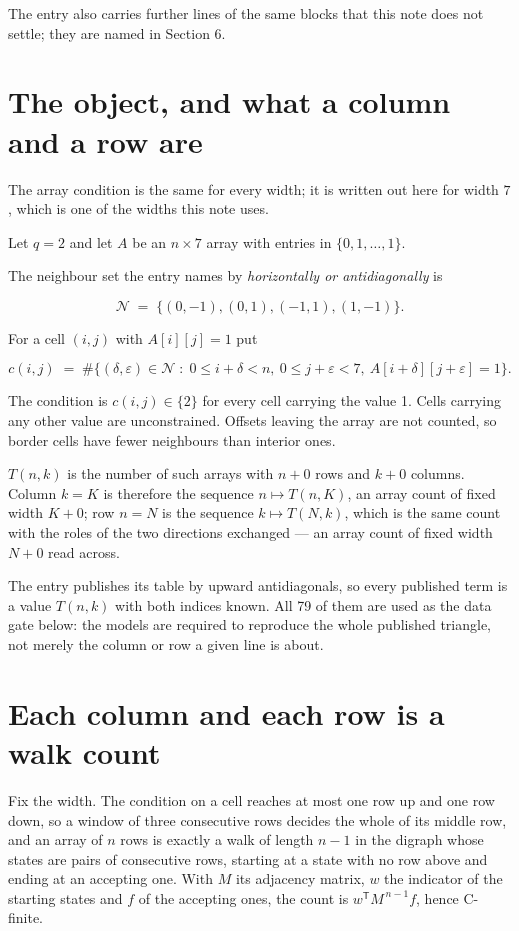 \documentclass[11pt]{article}
\theoremstyle{definition}
\begin{document}
The entry also carries further lines of the same blocks that this note does not settle; they are named in Section 6.

\section{The object, and what a column and a row are}

The array condition is the same for every width; it is written out here for width $7$, which is one of the widths this note uses.

Let $q = 2$ and let $A$ be an $n \times 7$ array with entries in $\{0,1,\dots,1\}$.

The neighbour set the entry names by {\itshape horizontally or antidiagonally} is

\[\mathcal{N} \;=\; \{(0,-1), (0,1), (-1,1), (1,-1)\}.\]

For a cell $(i,j)$ with $A[i][j] = 1$ put

\[c(i,j) \;=\; \#\bigl\{(\delta,\varepsilon)\in\mathcal{N} \;:\; 0\le i+\delta<n,\ 0\le j+\varepsilon<7,\ A[i+\delta][j+\varepsilon] = 1\bigr\}.\]

The condition is $c(i,j) \in \{2\}$ for every cell carrying the value 1. Cells carrying any other value are unconstrained. Offsets leaving the array are not counted, so border cells have fewer neighbours than interior ones.

$T(n,k)$ is the number of such arrays with $n + 0$ rows and $k + 0$ columns. Column $k = K$ is therefore the sequence $n \mapsto T(n,K)$, an array count of fixed width $K + 0$; row $n = N$ is the sequence $k \mapsto T(N,k)$, which is the same count with the roles of the two directions exchanged --- an array count of fixed width $N + 0$ read across.

The entry publishes its table by upward antidiagonals, so every published term is a value $T(n,k)$ with both indices known. All 79 of them are used as the data gate below: the models are required to reproduce the whole published triangle, not merely the column or row a given line is about.

\section{Each column and each row is a walk count}

Fix the width. The condition on a cell reaches at most one row up and one row down, so a window of three consecutive rows decides the whole of its middle row, and an array of $n$ rows is exactly a walk of length $n-1$ in the digraph whose states are pairs of consecutive rows, starting at a state with no row above and ending at an accepting one. With $M$ its adjacency matrix, $w$ the indicator of the starting states and $f$ of the accepting ones, the count is $w^{\mathsf T}M^{\,n-1}f$, hence C-finite.
\end{document}

